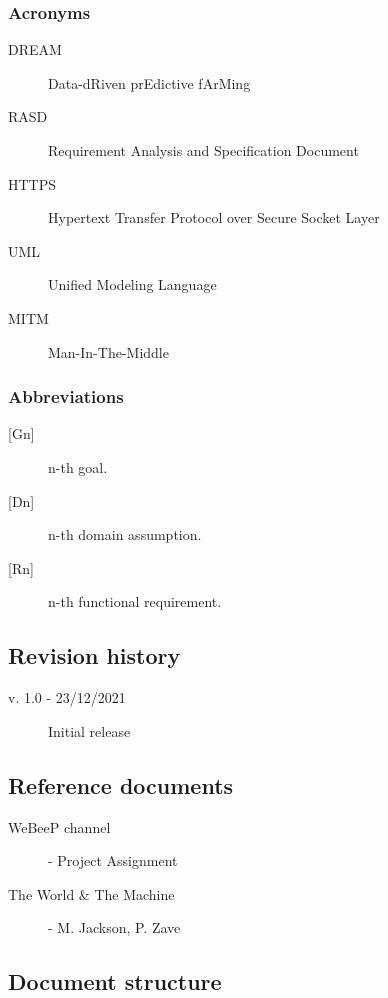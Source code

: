 \subsubsection{Acronyms}

\begin{description}
    \item [DREAM] Data-dRiven prEdictive fArMing
    \item [RASD] Requirement Analysis and Specification Document
    \item [HTTPS] Hypertext Transfer Protocol over Secure Socket Layer
    \item [UML] Unified Modeling Language
    \item [MITM] Man-In-The-Middle
\end{description}

\subsubsection{Abbreviations}

\begin{description}
    \item [{[Gn]}] n-th goal.
    \item [{[Dn]}] n-th domain assumption.
    \item [{[Rn]}] n-th functional requirement.
\end{description}

\bigskip
\subsection{Revision history}

\begin{description}
    \item[v. 1.0 - 23/12/2021] Initial release
\end{description} 

\bigskip
\subsection{Reference documents}

\begin{description}
    \item [WeBeeP channel] - Project Assignment
    \item [The World \& The Machine] - M. Jackson, P. Zave 
\end{description}

\bigskip
\subsection{Document structure}

